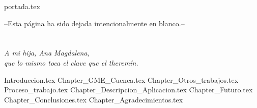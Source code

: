 \documentclass[a4paper,openany,oneside,12pt]{report}
\begin{document}

	{portada.tex}
	\newpage
	\mbox{}
	\setcounter{page}{2}
	\thispagestyle{plain}
	\pagestyle{fancy}

\onehalfspace

\vfill
\begin{center}
	--Esta página ha sido dejada intencionalmente en blanco.--
\end{center}
\vfill
\thispagestyle{empty}
\setcounter{page}{2}


\chapter*{}
\begin{flushright}
	\textit{A mi hija, Ana Magdalena, \\
		que lo mismo toca el clave que el theremín.}
\end{flushright}
\setcounter{page}{3}

\renewcommand\abstractname{Abstract}
\begin{abstract}
	\setcounter{page}{4}
	{ingles.tex}
	\thispagestyle{plain}
\end{abstract}
\renewcommand\abstractname{Resumen}
\begin{abstract}
	\setcounter{page}{5}
	{espanol.tex}
	\thispagestyle{plain}
\end{abstract}


	\setcounter{page}{6}
	\tableofcontents
	\listoffigures %
	\listoftables
	


	
	{Introduccion.tex}
	{Chapter_GME_Cuenca.tex}
	{Chapter_Otros_trabajos.tex}
	{Proceso_trabajo.tex}
	{Chapter_Descripcion_Aplicacion.tex}
	{Chapter_Futuro.tex}
	{Chapter_Conclusiones.tex}
	{Chapter_Agradecimientos.tex}
\end{document}
